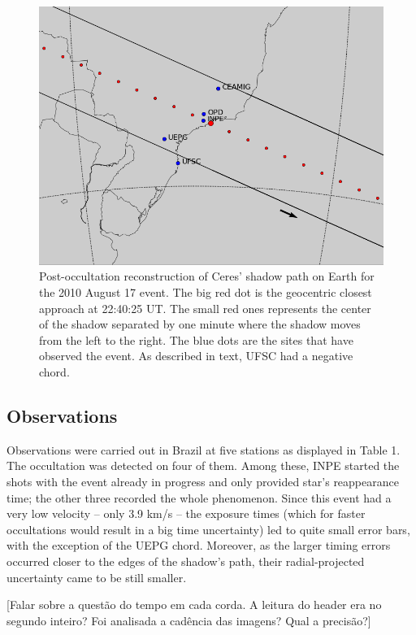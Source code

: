 \documentclass[useAMS,usenatbib]{mn2e}
\begin{document}
\begin{figure}
\includegraphics[scale=0.42]{figures/Ceres_2010.png} 
\caption{Post-occultation reconstruction of Ceres' shadow path on Earth for the 2010 August 17 event. The big red dot is the geocentric closest approach at 22:40:25 UT. The small red ones represents the center of the shadow separated by one minute where the shadow moves from the left to the right. The blue dots are the sites that have observed the event. As described in text, UFSC had a negative chord.
\label{Fig: Ceres-2010-map}}
\end{figure}



\subsection{Observations}

Observations were carried out in Brazil at five stations as displayed in Table 1. The occultation was detected on four of them. Among these, INPE started the shots with the event already in progress and only provided star's reappearance time; the other three recorded the whole phenomenon.  Since this event had a very low velocity -- only 3.9 km/s -- the exposure times (which for faster occultations would result in a big time uncertainty) led to quite small error bars, with the exception of the UEPG chord. Moreover, as the larger timing errors occurred closer to the edges of the shadow's path, their radial-projected uncertainty came to be still smaller.

[Falar sobre a quest\~ao do tempo em cada corda. A leitura do header era no segundo inteiro? Foi analisada a cad\^encia das imagens? Qual a precis\~ao?]
\end{document}
